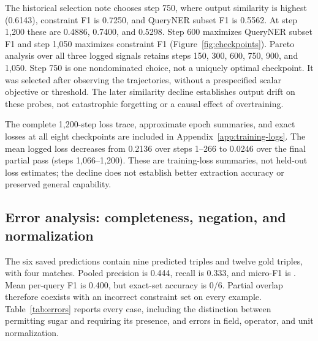 \documentclass{article}
\begin{document}


The historical selection note chooses step 750, where output similarity is highest (0.6143), constraint F1 is 0.7250, and QueryNER subset F1 is 0.5562. At step 1,200 these are 0.4886, 0.7400, and 0.5298. Step 600 maximizes QueryNER subset F1 and step 1,050 maximizes constraint F1 (Figure~\ref{fig:checkpoints}). Pareto analysis over all three logged signals retains steps 150, 300, 600, 750, 900, and 1,050. Step 750 is one nondominated choice, not a uniquely optimal checkpoint. It was selected after observing the trajectories, without a prespecified scalar objective or threshold. The later similarity decline establishes output drift on these probes, not catastrophic forgetting or a causal effect of overtraining.

The complete 1,200-step loss trace, approximate epoch summaries, and exact losses at all eight checkpoints are included in Appendix~\ref{app:training-logs}. The mean logged loss decreases from 0.2136 over steps 1--266 to 0.0246 over the final partial pass (steps 1,066--1,200). These are training-loss summaries, not held-out loss estimates; the decline does not establish better extraction accuracy or preserved general capability.

\subsection{Error analysis: completeness, negation, and normalization}
The six saved predictions contain nine predicted triples and twelve gold triples, with four matches. Pooled precision is 0.444, recall is 0.333, and micro-F1 is \FreshMicroF{}. Mean per-query F1 is 0.400, but exact-set accuracy is 0/6. Partial overlap therefore coexists with an incorrect constraint set on every example. Table~\ref{tab:errors} reports every case, including the distinction between permitting sugar and requiring its presence, and errors in field, operator, and unit normalization.
\end{document}
